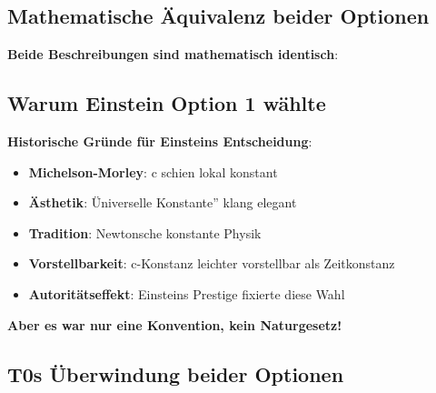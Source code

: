 	\subsection{Mathematische Äquivalenz beider Optionen}
	
	\textbf{Beide Beschreibungen sind mathematisch identisch}:
	
	\begin{table}[htbp]
		\centering
		\caption{Zwei Sichten, identische Physik}
	\end{table}
	
	\subsection{Warum Einstein Option 1 wählte}
	
	\textbf{Historische Gründe für Einsteins Entscheidung}:
	\begin{itemize}
		\item \textbf{Michelson-Morley}: c schien lokal konstant
		\item \textbf{Ästhetik}: Üniverselle Konstante'' klang elegant
		\item \textbf{Tradition}: Newtonsche konstante Physik
		\item \textbf{Vorstellbarkeit}: c-Konstanz leichter vorstellbar als Zeitkonstanz
		\item \textbf{Autoritätseffekt}: Einsteins Prestige fixierte diese Wahl
	\end{itemize}
	
	\textbf{Aber es war nur eine Konvention, kein Naturgesetz!}
	
	\subsection{T0s Überwindung beider Optionen}
	
